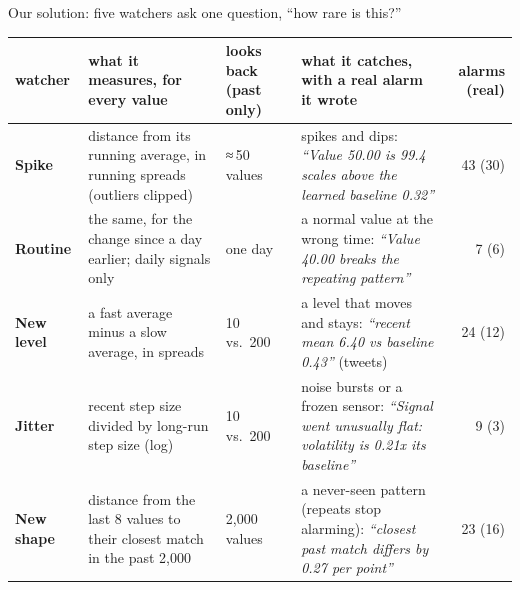 \documentclass[aspectratio=169, 10pt]{beamer}
\begin{document}
\begin{frame}{Our solution: five watchers ask one question, “how rare is this?”}
  \vspace{2.5mm}
  \raggedright
  {\scriptsize\setlength{\tabcolsep}{3pt}\renewcommand{\arraystretch}{1.05}
  \begin{tabular}{@{}L{1.55cm} L{4.35cm} L{1.5cm} L{5.4cm} r@{}}
    \toprule
    watcher & what it measures, for every value & looks back (past only) & what it catches, with a real alarm it wrote & alarms (real)\\
    \midrule
    \textbf{Spike} & distance from its running average, in running spreads (outliers clipped)
      & ≈\,50 values & spikes and dips: \emph{“Value 50.00 is 99.4 scales above the learned baseline 0.32”} & 43 (30)\\[0.6mm]
    \textbf{Routine} & the same, for the change since a day earlier; daily signals only & one day &
      a normal value at the wrong time: \emph{“Value 40.00 breaks the repeating pattern”} & 7 (6)\\[0.6mm]
    \textbf{New level} & a fast average minus a slow average, in spreads & 10 vs.\ 200 & a level that moves and stays:
      \emph{“recent mean 6.40 vs baseline 0.43”} (tweets) & 24 (12)\\[0.6mm]
    \textbf{Jitter} & recent step size divided by long-run step size (log) & 10 vs.\ 200 & noise bursts or a frozen
      sensor: \emph{“Signal went unusually flat: volatility is 0.21x its baseline”} & 9 (3)\\[0.6mm]
    \textbf{New shape} & distance from the last 8 values to their closest match in the past 2,000 & 2,000 values &
      a never-seen pattern (repeats stop alarming): \emph{“closest past match differs by 0.27 per point”} & 23 (16)\\
    \bottomrule
  \end{tabular}\par}
\end{frame}
\end{document}
